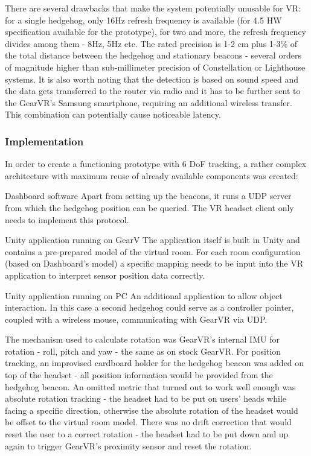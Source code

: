 \documentclass[12pt, a4paper]{article}
\newenvironment{definitions}
{\begin{description}[style=nextline]}
{\end{description}}
\begin{document}
There are several drawbacks that make the system potentially unusable for VR: for a single hedgehog, only 16Hz refresh frequency is available (for 4.5 HW specification available for the prototype), for two and more, the refresh frequency divides among them - 8Hz, 5Hz etc. The rated precision is 1-2 cm plus 1-3\% of the total distance between the hedgehog and stationary beacons - several orders of magnitude higher than sub-millimeter precision of Constellation or Lighthouse systems. It is also worth noting that the detection is based on sound speed and the data gets transferred to the router via radio and it has to be further sent to the GearVR’s Samsung smartphone, requiring an additional wireless transfer. This combination can potentially cause noticeable latency.


\subsubsection{Implementation}
In order to create a functioning prototype with 6 DoF tracking, a rather complex architecture with maximum reuse of already available components was created:

\begin{definitions}
\item[Dashboard software] Apart from setting up the beacons, it runs a UDP server from which the hedgehog position can be queried. The VR headset client only needs to implement this protocol.
\item[Unity application running on GearV] The application itself is built in Unity and contains a pre-prepared model of the virtual room. For each room configuration (based on Dashboard’s model) a specific mapping needs to be input into the VR application to interpret sensor position data correctly.
\item[Unity application running on PC] An additional application to allow object interaction. In this case a second hedgehog could serve as a controller pointer, coupled with a wireless mouse, communicating with GearVR via UDP.
\end{definitions}

The mechanism used to calculate rotation was GearVR’s internal IMU for rotation - roll, pitch and yaw - the same as on stock GearVR. For position tracking, an improvised cardboard holder for the hedgehog beacon was added on top of the headset - all position information would be provided from the hedgehog beacon. An omitted metric that turned out to work well enough was absolute rotation tracking - the headset had to be put on users’ heads while facing a specific direction, otherwise the absolute rotation of the headset would be offset to the virtual room model. There was no drift correction that would reset the user to a correct rotation - the headset had to be put down and up again to trigger GearVR’s proximity sensor and reset the rotation.
\end{document}
